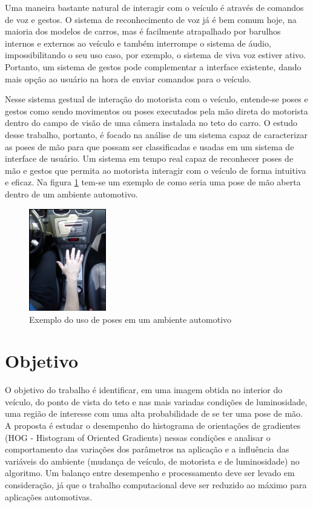 Uma maneira bastante natural de interagir com o veículo é através de comandos de voz e gestos. O sistema de reconhecimento de voz já é bem comum hoje, na maioria dos modelos de carros, mas é facilmente atrapalhado por barulhos internos e externos ao veículo e também interrompe o sistema de áudio, impossibilitando o seu uso caso, por exemplo, o sistema de viva voz estiver ativo. Portanto, um sistema de gestos pode complementar a interface existente, dando mais opção ao usuário na hora de enviar comandos para o veículo.

Nesse sistema gestual de interação do motorista com o veículo, entende-se poses e gestos como sendo movimentos ou poses executados pela mão direta do motorista dentro do campo de visão de uma câmera instalada no teto do carro.
O estudo desse trabalho, portanto, é focado na análise de um sistema capaz de caracterizar as poses de mão para que possam ser classificadas e usadas em um sistema de interface de usuário. Um sistema em tempo real capaz de reconhecer poses de mão e gestos que permita ao motorista interagir com o veículo de forma intuitiva e eficaz. Na figura \ref{fig:visao_aplicacao} tem-se um exemplo de como seria uma pose de mão aberta dentro de um ambiente automotivo.

\begin{figure}[ht!]
	\centering
	\includegraphics[width=0.3\textwidth]{image/exemplo_visao_aplicacao.png}
	\caption{Exemplo do uso de poses em um ambiente automotivo}
	\label{fig:visao_aplicacao}
\end{figure}

\section{Objetivo}

O objetivo do trabalho é identificar, em uma imagem obtida no interior do veículo, do ponto de vista do teto e nas mais variadas condições de luminosidade, uma região de interesse com uma alta probabilidade de se ter uma pose de mão. A proposta é estudar o desempenho do histograma de orientações de gradientes (HOG - Histogram of Oriented Gradients) nessas condições e analisar o comportamento das variações dos parâmetros na aplicação e a influência das variáveis do ambiente (mudança de veículo, de motorista e de luminosidade) no algoritmo.
Um balanço entre desempenho e processamento deve ser levado em consideração, já que o trabalho computacional deve ser reduzido ao máximo para aplicações automotivas.


